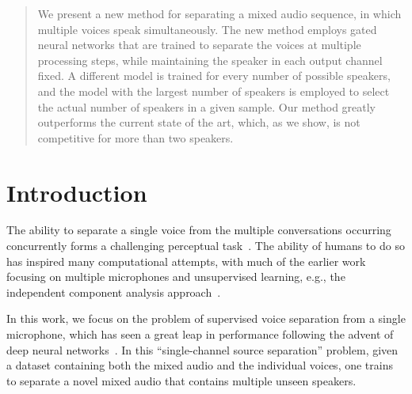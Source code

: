 \documentclass{article}
\begin{document}
\printAffiliationsAndNotice{}

\begin{abstract}
We present a new method for separating a mixed audio sequence, in which multiple voices speak simultaneously. The new method employs gated neural networks that are trained to separate the voices at multiple processing steps, while maintaining the speaker in each output channel fixed. A different model is trained for every number of possible speakers, and the model with the largest number of speakers is employed to select the actual number of speakers in a given sample. Our method greatly outperforms the current state of the art, which, as we show, is not competitive for more than two speakers. 
\end{abstract}

\section{Introduction}

The ability to separate a single voice from the multiple conversations occurring concurrently forms a challenging perceptual task~\cite{capon1969high,frost1972algorithm}. The ability of humans to do so has inspired many computational attempts, with much of the earlier work focusing on multiple microphones and unsupervised learning, e.g., the independent component analysis approach~\cite{hyvarinen2000independent}.

In this work, we focus on the problem of supervised voice separation from a single microphone, which has seen a great leap in performance following the advent of deep neural networks~\cite{hershey2016deep,luo2018tasnet}. In this ``single-channel source separation'' problem, given a dataset containing both the mixed audio and the individual voices, one trains to separate a novel mixed audio that contains multiple unseen speakers. 
\end{document}
